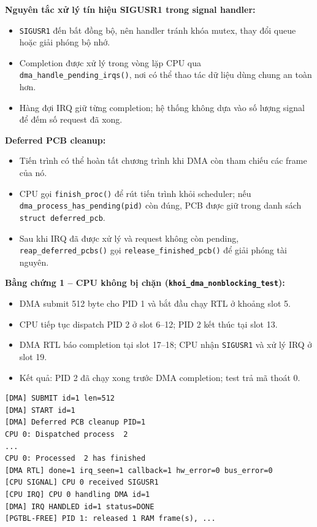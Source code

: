 \documentclass[12pt,a4paper]{article}
\begin{document}
	\noindent\textbf{Nguyên tắc xử lý tín hiệu SIGUSR1 trong signal handler:}
	\begin{itemize}
	    \item \texttt{SIGUSR1} đến bất đồng bộ, nên handler tránh khóa mutex, thay đổi queue hoặc giải phóng bộ nhớ.
	    \item Completion được xử lý trong vòng lặp CPU qua \texttt{dma\_handle\_pending\_irqs()}, nơi có thể thao tác dữ liệu dùng chung an toàn hơn.
	    \item Hàng đợi IRQ giữ từng completion; hệ thống không dựa vào số lượng signal để đếm số request đã xong.
	\end{itemize}

	\noindent\textbf{Deferred PCB cleanup:}
	\begin{itemize}
	    \item Tiến trình có thể hoàn tất chương trình khi DMA còn tham chiếu các frame của nó.
	    \item CPU gọi \texttt{finish\_proc()} để rút tiến trình khỏi scheduler; nếu \texttt{dma\_process\_has\_pending(pid)} còn đúng, PCB được giữ trong danh sách \texttt{struct deferred\_pcb}.
	    \item Sau khi IRQ đã được xử lý và request không còn pending, \texttt{reap\_deferred\_pcbs()} gọi \texttt{release\_finished\_pcb()} để giải phóng tài nguyên.
	\end{itemize}

	\noindent\textbf{Bằng chứng 1 -- CPU không bị chặn (\texttt{khoi\_dma\_nonblocking\_test}):}
	\begin{itemize}
	    \item DMA submit 512 byte cho PID 1 và bắt đầu chạy RTL ở khoảng slot 5.
	    \item CPU tiếp tục dispatch PID 2 ở slot 6--12; PID 2 kết thúc tại slot 13.
	    \item DMA RTL báo completion tại slot 17--18; CPU nhận \texttt{SIGUSR1} và xử lý IRQ ở slot 19.
	    \item Kết quả: PID 2 đã chạy xong trước DMA completion; test trả mã thoát 0.
	\end{itemize}

	\begin{lstlisting}[basicstyle=\ttfamily\footnotesize]
[DMA] SUBMIT id=1 len=512
[DMA] START id=1
[DMA] Deferred PCB cleanup PID=1
CPU 0: Dispatched process  2
...
CPU 0: Processed  2 has finished
[DMA RTL] done=1 irq_seen=1 callback=1 hw_error=0 bus_error=0
[CPU SIGNAL] CPU 0 received SIGUSR1
[CPU IRQ] CPU 0 handling DMA id=1
[DMA] IRQ HANDLED id=1 status=DONE
[PGTBL-FREE] PID 1: released 1 RAM frame(s), ...
	\end{lstlisting}
\end{document}
